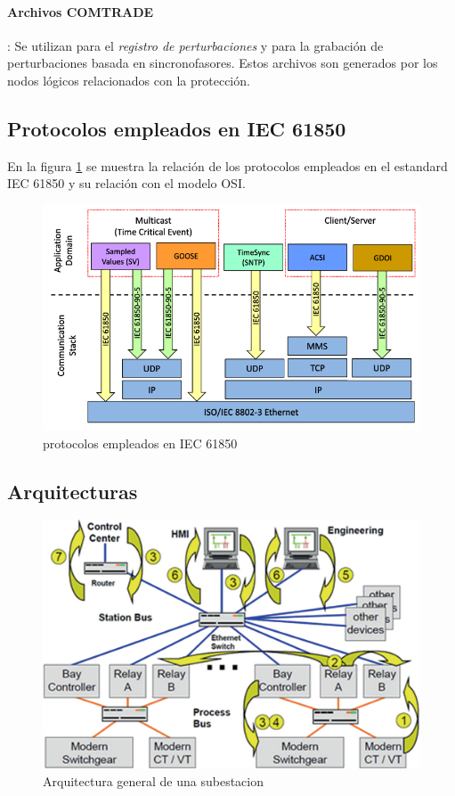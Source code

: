 \documentclass[a5paper]{book}%
\begin{document}
\paragraph{Archivos COMTRADE}: Se utilizan para el \textit{registro de perturbaciones} y para la grabación de perturbaciones basada en sincronofasores. Estos archivos son generados por los nodos lógicos relacionados con la protección.


\subsection{Protocolos empleados en IEC 61850}

En la figura \ref{fig:protocolosiec61850} se muestra la relación de los protocolos empleados en el estandard IEC 61850 y su relación con el modelo OSI.

\begin{figure}[H]
      \centering
      \caption{protocolos empleados en IEC 61850}
      \label{fig:protocolosiec61850}
      \includegraphics[width=0.7\linewidth]{cliente_servidor_61850}
    \end{figure}
    
    

\subsection{Arquitecturas}

\begin{figure}[h]
	\centering
	\caption{Arquitectura general de una subestacion}
	\label{fig:arquitecturasubestacion}
	\includegraphics[width=0.7\linewidth]{arquitectura_subestacion}
\end{figure}
\end{document}
